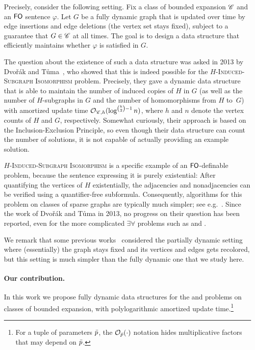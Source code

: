 Precisely, consider the following setting. Fix a class of bounded expansion $\mathscr C$ and an $\mathsf{FO}$ sentence $\varphi$. Let $G$ be a fully dynamic graph that is updated over time by edge insertions and edge deletions (the vertex set stays fixed), subject to a guarantee that $G\in \mathscr C$ at all times. The goal is to design a data structure that efficiently maintains whether $\varphi$ is satisfied in $G$.

The question about the existence of such a data structure was asked in 2013 by Dvo\v{r}\'ak and T\r{u}ma~\cite{DvorakT13}, who showed that this is indeed possible for the \textsc{$H$-Induced-Subgraph Isomorphism} problem. Precisely, they gave a dynamic data structure that is able to maintain the number of induced copies of $H$ in $G$ (as well as the number of $H$-subgraphs in $G$ and the number of homomorphisms from $H$ to~$G$) with amortized update time $\mathcal{O}_{\mathscr C,h}(\log^{\binom{h}{2}-1} n)$, where $h$ and $n$ denote the vertex counts of $H$ and $G$, respectively. Somewhat curiously, their approach is based on the Inclusion-Exclusion Principle, so even though their data structure can count the number of solutions, it is not capable of actually providing an example solution.

\textsc{$H$-Induced-Subgraph Isomorphism} is a specific example of an $\mathsf{FO}$-definable problem, because the sentence expressing it is purely existential: After quantifying the vertices of $H$   existentially, the adjacencies and nonadjacencies can be verified using a quantifier-free subformula. Consequently, algorithms for this problem on classes of sparse graphs are typically much simpler; see e.g.~\cite{NesetrilM08a}. Since the work of Dvo\v{r}\'ak and T\r{u}ma in 2013, no progress on their question has been reported, even for the more complicated $\exists\forall$ problems such as  and .

We remark that some previous works~\cite{DvorakKT13,Torunczyk20} considered the partially dynamic setting where (essentially) the graph stays fixed and its vertices and edges gets recolored, but this setting is much simpler than the fully dynamic one that we study here.

\paragraph*{Our contribution.} In this work we propose fully dynamic data structures for the  and  problems on classes of bounded expansion, with polylogarithmic amortized update time.\footnote{For a tuple of parameters ${\bar{p}}$, the $\mathcal{O}_{{\bar{p}}}(\cdot)$ notation hides multiplicative factors that may depend on ${\bar{p}}$.} 

